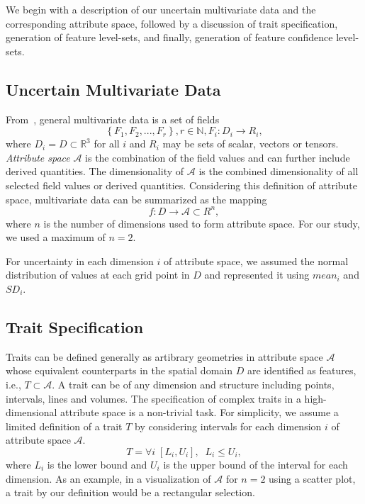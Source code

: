 


We begin with a description of our uncertain multivariate data and the corresponding attribute space, followed by a discussion of trait specification, generation of feature level-sets, and finally, generation of feature confidence level-sets.

\vspace{-2mm}
\subsection{Uncertain Multivariate Data}
%
From~\cite{jankowai2020feature}, general multivariate data is a set of fields
\begin{equation}
\left\{F_{1},F_{2},...,F_{r}\right\}, r\in\mathbb{N}, F_{i}:D_{i} \to R_{i},
\end{equation}
where $D_{i} = D \subset \mathbb{R}^{3}$ for all $i$ and $R_{i}$ may be sets of scalar, vectors or tensors.
%
\textit{Attribute space} $\mathcal{A}$ is the combination of the field values and can further include derived quantities.
%
The dimensionality of $\mathcal{A}$ is the combined dimensionality of all selected field values or derived quantities.
%
Considering this definition of attribute space, multivariate data can be summarized as the mapping
\begin{equation}
f : D \to \mathcal{A} \subset R^{n},
\end{equation}
%
where $n$ is the number of dimensions used to form attribute space. 
%
For our study, we used a maximum of $n = 2$. 
%

For uncertainty in each dimension $i$ of attribute space, we assumed the normal distribution of values at each grid point in $D$ and represented it using $mean_{i}$ and $SD_{i}$. 

\vspace{-2mm}
\subsection{Trait Specification}
Traits can be defined generally as artibrary geometries in attribute space $\mathcal{A}$ whose equivalent counterparts in the spatial domain $D$ are identified as features, i.e., $T\subset\mathcal{A}$.
%
A trait can be of any dimension and structure including points, intervals, lines and volumes.
%
The specification of complex traits in a high-dimensional attribute space is a non-trivial task.
%
For simplicity, we assume a limited definition of a trait $T$ by considering intervals for each dimension $i$ of attribute space $\mathcal{A}$.
%
\begin{equation}	
T = \forall{i}\;[L_{i}, U_{i}], \;\;L_{i} \leqslant U_{i}, 
\end{equation}
where $L_{i}$ is the lower bound and $U_{i}$ is the upper bound of the interval for each dimension.
%
As an example, in a visualization of $\mathcal{A}$ for $n = 2$ using a scatter plot, a trait by our definition would be a rectangular selection.


